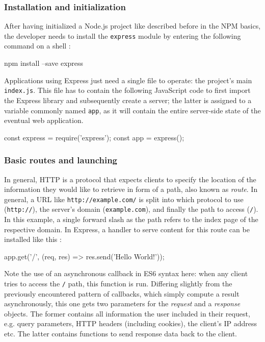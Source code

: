 \documentclass{bioinfo}
\begin{document}
\subsubsection{Installation and initialization}

After having initialized a Node.js project like described before in the NPM basics, the developer needs to install the \texttt{express} module by entering the following command on a shell \cite{expressinstalling}:

\begin{verbatim*}
    npm install --save express
\end{verbatim*}

Applications using Express just need a single file to operate: the project's main \texttt{index.js}. This file has to contain the following JavaScript code to first import the Express library and subsequently create a server; the latter is assigned to a variable commonly named \texttt{app}, as it will contain the entire server-side state of the eventual web application.

\begin{verbatim*}
    const express = require('express');
    const app = express();
\end{verbatim*}

\subsubsection{Basic routes and launching}

In general, HTTP is a protocol that expects clients to specify the location of the information they would like to retrieve in form of a path, also known as \textit{route}. In general, a URL like \texttt{http://example.com/} is split into which protocol to use (\texttt{http://}), the server's domain (\texttt{example.com}), and finally the path to access (\texttt{/}). In this example, a single forward slash as the path refers to the index page of the respective domain. In Express, a handler to serve content for this route can be installed like this \cite{expresshelloworld}:

\begin{verbatim*}
    app.get('/', (req, res) =>
        res.send('Hello World!'));
\end{verbatim*}

Note the use of an asynchronous callback in ES6 syntax here: when any client tries to access the \texttt{/} path, this function is run. Differing slightly from the previously encountered pattern of callbacks, which simply compute a result asynchronously, this one gets two parameters for the \textit{request} and a \textit{response} objects. The former contains all information the user included in their request, e.g. query parameters, HTTP headers (including cookies), the client's IP address etc. The latter contains functions to send response data back to the client.
\end{document}
